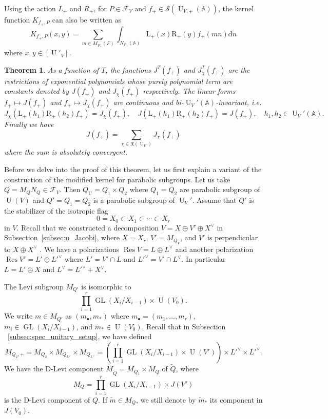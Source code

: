 \documentclass[letterpaper,11pt]{amsart}
\newcommand{\fX}{\mathfrak{X}}
\newcommand{\bA}{\mathbb{A}}
\newcommand{\cF}{\mathcal{F}}
\newcommand{\cS}{\mathcal{S}}
\newcommand{\rd}{\mathrm{d}}
\newcommand{\<}{\negthickspace}
\DeclareMathOperator{\GL}{GL}
\DeclareMathOperator{\U}{U}
\DeclareMathOperator{\Res}{Res}
\theoremstyle{definition}
\theoremstyle{plain}
\newtheorem{theorem}[definition]{Theorem}
\theoremstyle{remark}
\numberwithin{equation}{section}
\begin{document}
Using the action $L_+$ and $R_+$, for $P \in \cF_V$ and $f_+ \in \cS(\U_{V,+}(\bA))$, the kernel function $K_{f_+,P}$ can also be written as
\begin{equation} \label{eq:u_kernel_L_+_R_+}
    K_{f_+,P}(x,y) = \sum_{m \in M_{P_+}(F)} \int_{N_{P_+}(\bA)} \mathrm{L}_+(x)\mathrm{R}_+(y)f_+(mn) \rd n
\end{equation}
where $x,y \in [\U'_V]$.

\begin{theorem} \label{thm:coarse_spectral_u}
As a function of $T$, the functions $J^T(f_+)$ and $J^T_\chi(f_+)$ are the restrictions of
exponential polynomials whose purely polynomial term are constants denoted by
$J(f_+)$ and $J_\chi(f_+)$ respectively. The linear forms $f_+ \mapsto J(f_+)$ and $f_+ \mapsto
J_{\chi}(f_+)$ are continuous and bi-$\U_V'(\bA)$-invariant, i.e.
    \[
    J_{\chi}(\mathrm{L}_+(h_1) \mathrm{R}_+(h_2) f_+) =
    J_{\chi}(f_+), \quad
    J(\mathrm{L}_+(h_1) \mathrm{R}_+(h_2) f_+) =
    J(f_+), \quad h_1, h_2 \in \U_V'(\bA).
    \]
Finally we have
    \[
    J(f_+) = \sum_{\chi \in \fX(\U_V)} J_\chi(f_+)
    \]
where the sum is absolutely convergent.
\end{theorem}

Before we delve into the proof of this theorem, let us first explain a
variant of the construction of the modified kernel for parabolic subgroups.
Let us take $Q = M_Q N_Q \in \cF_V$. Then $Q_{\U} = Q_1 \times Q_2$ where $Q_1 =
Q_2$ are parabolic subgroup of $\U(V)$ and $Q' = Q_1 = Q_2$ is a parabolic
subgroup of $\U_V'$. Assume that $Q'$ is the stabilizer of the isotropic flag
    \begin{equation}    \label{eq:isotropic_flag_Q'}
    0 = X_0 \subset X_1 \subset \cdots \subset X_r
    \end{equation}
in $V$. Recall that we constructed a decomposition
$V = X \oplus V' \oplus X^\vee$ in
Subsection~\ref{subsec:u_Jacobi}, where $X = X_r$,
$V'=M_{Q_V}$, and $V'$ is perpendicular to $X \oplus X^\vee$ . We have a polarizations $\Res V = L \oplus L^\vee$ and another polarization $\Res V' =  L' \oplus L'^{\vee}$ where $L' = V' \cap L$ and $L'^\vee = V' \cap L^\vee$. In particular $L = L' \oplus X$
and $L^\vee = L'^\vee + X^\vee$.

The Levi subgroup $M_{Q'}$ is isomorphic to
    \[
    \prod_{i = 1}^{r} \GL(X_i/X_{i-1}) \times \U(V_0).
    \]
We write $m \in M_{Q'}$ as $(m_{\bullet}, m_*)$ where $m_{\bullet} = (m_1,
\hdots, m_r)$, $m_i \in \GL(X_i/X_{i-1})$, and $m_* \in \U(V_0)$. Recall that in Subsection ~\ref{subsec:spec_unitary_setup}, we have defined
    \[
    M_{Q_2, +}= M_{Q_2} \times M_{Q_{L^\vee}} \times M_{Q_{L^\vee}}  =  \left( \prod_{i = 1}^{r} \GL(X_i/X_{i-1}) \times
    \U(V') \right) \times L'^\vee \times L'^\vee.
    \]
We have the D-Levi component $ M_{\widetilde{Q}} = M_{Q_1} \times M_Q$
of $\widetilde{Q}$, where
    \[
    M_{Q} = \prod_{i = 1}^{r} \GL(X_i/X_{i-1}) \times J(V')
    \]
is the D-Levi component of $Q$. If $\widetilde{m}
\in M_Q$, we still denote by $\widetilde{m}_*$ its component
in $J(V_0)$.
\end{document}
